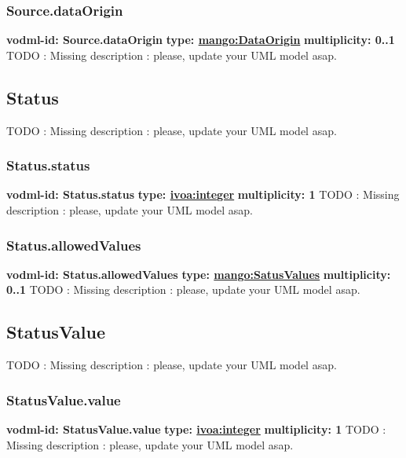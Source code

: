 {    \subsubsection{Source.dataOrigin}
      \textbf{vodml-id: Source.dataOrigin} \newline
      \textbf{type: \hyperref[sect:DataOrigin]{mango:DataOrigin}} \newline
      \textbf{multiplicity: 0..1} \newline 
      TODO : Missing description : please, update your UML model asap.

  \subsection{Status}
  \label{sect:Status}
    TODO : Missing description : please, update your UML model asap.

    \subsubsection{Status.status}
      \textbf{vodml-id: Status.status} \newline
      \textbf{type: \hyperref[sect:ivoa]{ivoa:integer}} \newline
      \textbf{multiplicity: 1} \newline 
      TODO : Missing description : please, update your UML model asap.

    \subsubsection{Status.allowedValues}
      \textbf{vodml-id: Status.allowedValues} \newline
      \textbf{type: \hyperref[sect:SatusValues]{mango:SatusValues}} \newline
      \textbf{multiplicity: 0..1} \newline 
      TODO : Missing description : please, update your UML model asap.

  \subsection{StatusValue}
  \label{sect:StatusValue}
    TODO : Missing description : please, update your UML model asap.

    \subsubsection{StatusValue.value}
      \textbf{vodml-id: StatusValue.value} \newline
      \textbf{type: \hyperref[sect:ivoa]{ivoa:integer}} \newline
      \textbf{multiplicity: 1} \newline 
      TODO : Missing description : please, update your UML model asap.

}
